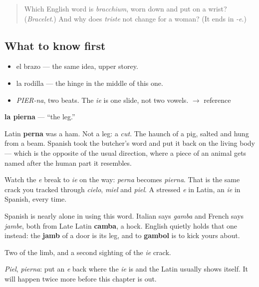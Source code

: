 \label{lesson:ES-C314-pierna}



\begin{quote}
Which English word is \emph{bracchium}, worn down and put on a wrist? (\emph{Bracelet}.) And why does \emph{triste} not change for a woman? (It ends in \emph{-e}.)
\end{quote}

\subsection*{What to know first}
\begin{itemize}
\raggedright
  \item el brazo — the same idea, upper storey.
  \item la rodilla — the hinge in the middle of this one.
\end{itemize}

\begin{sounds}
\begin{itemize}
\raggedright
  \item \emph{PIER-na}, two beats. The \emph{ie} is one slide, not two vowels. $\to$ reference
\end{itemize}
\end{sounds}

\begin{cousinweb}
\textbf{la pierna} — \textquotedblleft{}the leg.\textquotedblright{}

Latin \textbf{perna} was a ham. Not a leg: a \emph{cut}. The haunch of a pig, salted and hung from a beam. Spanish took the butcher's word and put it back on the living body — which is the opposite of the usual direction, where a piece of an animal gets named after the human part it resembles.

Watch the \emph{e} break to \emph{ie} on the way: \emph{perna} becomes \emph{pierna}. That is the same crack you tracked through \emph{cielo}, \emph{miel} and \emph{piel}. A stressed \emph{e} in Latin, an \emph{ie} in Spanish, every time.

Spanish is nearly alone in using this word. Italian says \emph{gamba} and French says \emph{jambe}, both from Late Latin \textbf{camba}, a hock. English quietly holds that one instead: the \textbf{jamb} of a door is its leg, and to \textbf{gambol} is to kick yours about.
\end{cousinweb}

\begin{grammarlens}[title={What you've built}]
Two of the limb, and a second sighting of the \emph{ie} crack.

\emph{Piel}, \emph{pierna}: put an \emph{e} back where the \emph{ie} is and the Latin usually shows itself. It will happen twice more before this chapter is out.
\end{grammarlens}

